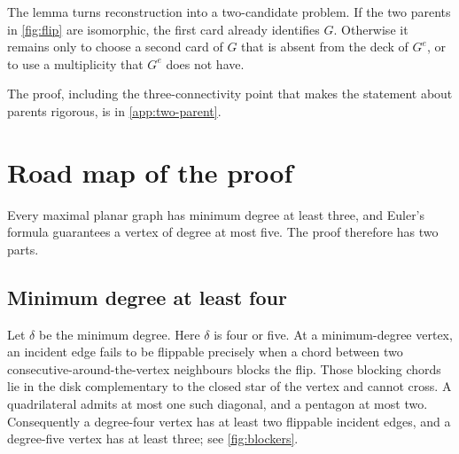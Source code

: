 \documentclass[11pt]{article}
\theoremstyle{definition}
\theoremstyle{remark}
\begin{document}
The lemma turns reconstruction into a two-candidate problem.  If the two
parents in \cref{fig:flip} are isomorphic, the first card already identifies
\(G\).  Otherwise it remains only to choose a second card of \(G\) that is
absent from the deck of \(G^e\), or to use a multiplicity that \(G^e\) does
not have.

The proof, including the three-connectivity point that makes the statement
about parents rigorous, is in \cref{app:two-parent}.

\section{Road map of the proof}

Every maximal planar graph has minimum degree at least three, and Euler's
formula guarantees a vertex of degree at most five.  The proof therefore has
two parts.

\subsection{Minimum degree at least four}

Let \(\delta\) be the minimum degree.  Here \(\delta\) is four or five.  At a
minimum-degree vertex, an incident edge fails to be flippable precisely when
a chord between two consecutive-around-the-vertex neighbours blocks the
flip.  Those blocking chords lie in the disk complementary to the closed
star of the vertex and cannot cross.  A quadrilateral admits at most one
such diagonal, and a pentagon at most two.  Consequently a degree-four
vertex has at least two flippable incident edges, and a degree-five vertex
has at least three; see \cref{fig:blockers}.
\end{document}
